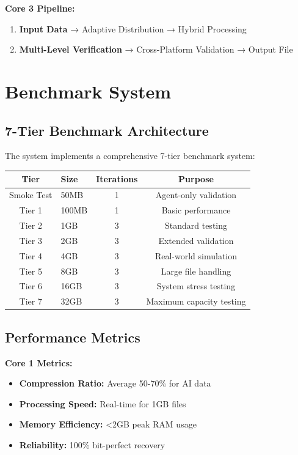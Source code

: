 \documentclass[12pt,a4paper]{article}
\begin{document}
\textbf{Core 3 Pipeline:}
\begin{enumerate}
    \item \textbf{Input Data} → Adaptive Distribution → Hybrid Processing
    \item \textbf{Multi-Level Verification} → Cross-Platform Validation → Output File
\end{enumerate}

\section{Benchmark System}

\subsection{7-Tier Benchmark Architecture}

The system implements a comprehensive 7-tier benchmark system:

\begin{center}
\begin{tabular}{|c|l|c|c|}
\hline
\textbf{Tier} & \textbf{Size} & \textbf{Iterations} & \textbf{Purpose} \\
\hline
Smoke Test & 50MB & 1 & Agent-only validation \\
Tier 1 & 100MB & 1 & Basic performance \\
Tier 2 & 1GB & 3 & Standard testing \\
Tier 3 & 2GB & 3 & Extended validation \\
Tier 4 & 4GB & 3 & Real-world simulation \\
Tier 5 & 8GB & 3 & Large file handling \\
Tier 6 & 16GB & 3 & System stress testing \\
Tier 7 & 32GB & 3 & Maximum capacity testing \\
\hline
\end{tabular}
\end{center}

\subsection{Performance Metrics}

\textbf{Core 1 Metrics:}
\begin{itemize}
    \item \textbf{Compression Ratio:} Average 50-70\% for AI data
    \item \textbf{Processing Speed:} Real-time for 1GB files
    \item \textbf{Memory Efficiency:} <2GB peak RAM usage
    \item \textbf{Reliability:} 100\% bit-perfect recovery
\end{itemize}
\end{document}
